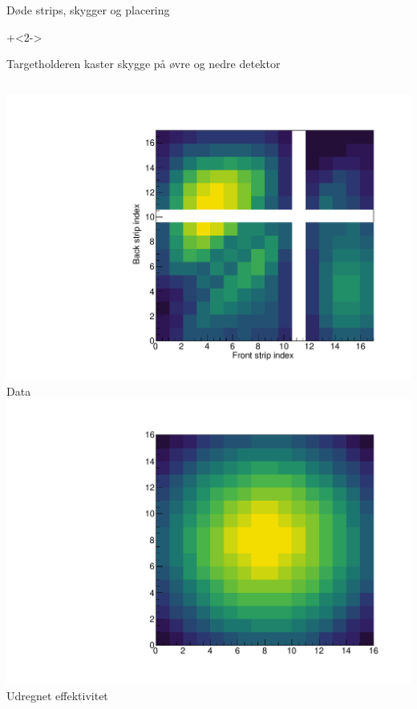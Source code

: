 \begin{frame}{Døde strips, skygger og placering}
	\begin{itemize}
		\onslide+<2->{\item Targetholderen kaster skygge på øvre og nedre detektor}
	\end{itemize}
	\begin{columns}
		\includegraphics[width=\columnwidth]{../figures/mexihatDet4.pdf}
		\tiny Data
		\onslide<4->
		\includegraphics[width=\columnwidth]{../figures/mexihatDet4Theory.pdf}
		\tiny Udregnet effektivitet
	\end{columns}
\end{frame}